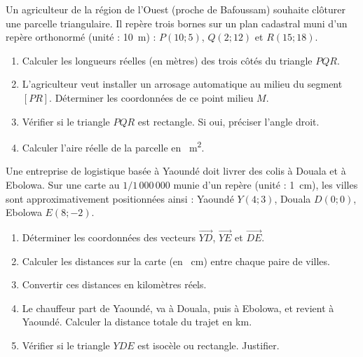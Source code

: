 \documentclass[11pt]{article}
\begin{document}
\begin{exercice}
Un agriculteur de la région de l'Ouest (proche de Bafoussam) souhaite clôturer une parcelle triangulaire. Il repère trois bornes sur un plan cadastral muni d'un repère orthonormé (unité : \SI{10}{\meter}) : $P(10; 5)$, $Q(2; 12)$ et $R(15; 18)$.
\begin{enumerate}
    \item Calculer les longueurs réelles (en mètres) des trois côtés du triangle $PQR$.
    \item L'agriculteur veut installer un arrosage automatique au milieu du segment $[PR]$. Déterminer les coordonnées de ce point milieu $M$.
    \item Vérifier si le triangle $PQR$ est rectangle. Si oui, préciser l'angle droit.
    \item Calculer l'aire réelle de la parcelle en \SI{}{\square\meter}.
\end{enumerate}
\end{exercice}

\begin{exercice}
Une entreprise de logistique basée à Yaoundé doit livrer des colis à Douala et à Ebolowa. Sur une carte au $1/1\,000\,000$ munie d'un repère (unité : \SI{1}{\centi\meter}), les villes sont approximativement positionnées ainsi : Yaoundé $Y(4; 3)$, Douala $D(0; 0)$, Ebolowa $E(8; -2)$.
\begin{enumerate}
    \item Déterminer les coordonnées des vecteurs $\overrightarrow{YD}$, $\overrightarrow{YE}$ et $\overrightarrow{DE}$.
    \item Calculer les distances sur la carte (en \SI{}{\centi\meter}) entre chaque paire de villes.
    \item Convertir ces distances en kilomètres réels.
    \item Le chauffeur part de Yaoundé, va à Douala, puis à Ebolowa, et revient à Yaoundé. Calculer la distance totale du trajet en km.
    \item Vérifier si le triangle $YDE$ est isocèle ou rectangle. Justifier.
\end{enumerate}
\end{exercice}
\end{document}
